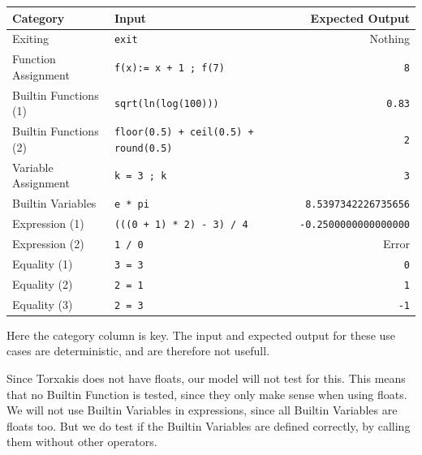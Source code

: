 \documentclass[11pt,a4paper]{article}
\begin{document}
\begin{center}
	\begin{tabular}{llr}
		Category & Input & Expected Output\\
		\hline
		Exiting & \texttt{exit} & Nothing\\
		Function Assignment & \texttt{f(x):= x + 1 ; f(7)} & \texttt{8}\\
		Builtin Functions (1) & \texttt{sqrt(ln(log(100)))} & \texttt{0.83}\\
		Builtin Functions (2) & \texttt{floor(0.5) + ceil(0.5) + round(0.5)} & \texttt{2}\\
		Variable Assignment & \texttt{k = 3 ; k} & \texttt{3}\\
		Builtin Variables & \texttt{e * pi} & \texttt{8.5397342226735656}\\
		Expression (1) & \texttt{(((0 + 1) * 2) - 3) / 4} & \texttt{-0.2500000000000000}\\
		Expression (2) & \texttt{1 / 0} & Error\\
		Equality (1) & \texttt{3 = 3} & \texttt{0}\\
		Equality (2) & \texttt{2 = 1} & \texttt{1}\\
		Equality (3) & \texttt{2 = 3} & \texttt{-1}\\
	\end{tabular}
\end{center}

Here the category column is key. The input and expected output for these use cases are deterministic, and are therefore not usefull. 

Since Torxakis does not have floats, our model will not test for this. This means that no Builtin Function is tested, since they only make sense when using floats. We will not use Builtin Variables in expressions, since all Builtin Variables are floats too. But we do test if the Builtin Variables are defined correctly, by calling them without other operators.



\end{document}
